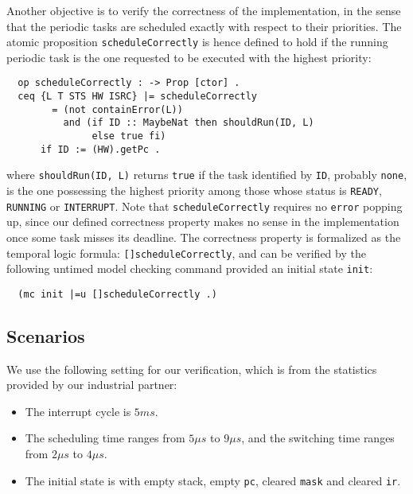 \documentclass{llncs}
\begin{document}
Another objective is to verify the correctness of the implementation,
in the sense that the periodic tasks are scheduled exactly with
respect to their priorities. The atomic proposition
\verb|scheduleCorrectly| is hence defined to hold if the running
periodic task is the one requested to be executed with the highest
priority:
\begin{verbatim}
  op scheduleCorrectly : -> Prop [ctor] .
  ceq {L T STS HW ISRC} |= scheduleCorrectly 
        = (not containError(L))
          and (if ID :: MaybeNat then shouldRun(ID, L)
               else true fi)
      if ID := (HW).getPc .
\end{verbatim}
where \verb|shouldRun(ID, L)| returns \verb|true| if the task
identified by \verb|ID|, probably \verb|none|, is the one possessing
the highest priority among those whose status is \verb|READY|,
\verb|RUNNING| or \verb|INTERRUPT|. Note that \verb|scheduleCorrectly|
requires no \verb|error| popping up, since our defined correctness
property makes no sense in the implementation once some task misses
its deadline. The correctness property is formalized as the temporal
logic formula: \verb|[]scheduleCorrectly|, and can be verified by the
following untimed model checking command provided an initial state
\verb|init|:
\begin{verbatim}
  (mc init |=u []scheduleCorrectly .)
\end{verbatim}

\subsection{Scenarios}
\label{ss:results}
We use the following setting for our verification, which is from the 
statistics provided by our industrial partner:
\begin{itemize}
\item The interrupt cycle is $5ms$.
\item The scheduling time ranges from $5{\mu}s$ to $9{\mu}s$, and the
switching time ranges from $2{\mu}s$ to $4{\mu}s$.
\item The initial state is with empty stack, empty \verb|pc|, cleared 
\verb|mask| and cleared \verb|ir|.
\end{itemize}
\end{document}
